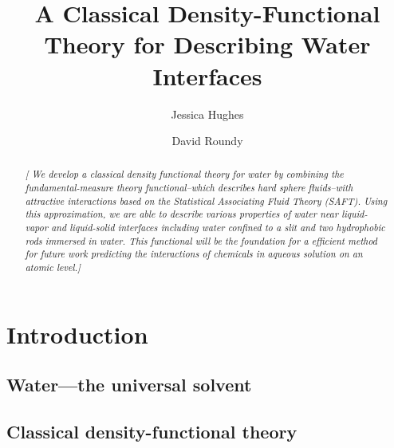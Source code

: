 \documentclass[letterpaper,twocolumn,amsmath,amssymb,prb]{revtex4-1}
\newcommand{\needsworklater}[1]{\emph{[#1]}}
\begin{document}
\title{A Classical Density-Functional Theory for Describing Water Interfaces}

\author{Jessica Hughes}

\author{David Roundy}

\begin{abstract}
\needsworklater{ We develop a classical density functional theory for
  water by combining the fundamental-measure theory functional--which
  describes hard sphere fluids--with attractive interactions based on the 
  Statistical Associating Fluid Theory (SAFT).  Using
  this approximation, we are able to describe various properties of
  water near liquid-vapor and liquid-solid interfaces including water confined 
  to a slit and two hydrophobic rods immersed in water.  This functional will be the 
  foundation for a efficient method for future work
  predicting the interactions of chemicals in aqueous solution on an
  atomic level.}

\tableofcontents
\end{abstract}

\maketitle

\section{Introduction}

\subsection{Water---the universal solvent}

\subsection{Classical density-functional theory}

\end{document}
